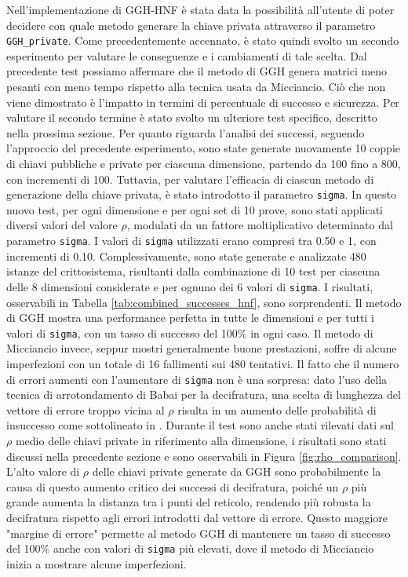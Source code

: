 Nell'implementazione di GGH-HNF è stata data la possibilità all'utente di poter decidere
con quale metodo generare la chiave privata attraverso il parametro \texttt{GGH\_private}.
Come precedentemente accennato, è stato quindi svolto un secondo esperimento per valutare 
le conseguenze e i cambiamenti di tale scelta. Dal precedente test possiamo affermare
che il metodo di GGH genera matrici meno pesanti con meno tempo rispetto alla tecnica
usata da Micciancio. Ciò che non viene dimostrato è l'impatto in termini di percentuale 
di successo e sicurezza. Per valutare il secondo termine è stato svolto un ulteriore 
test specifico, descritto nella prossima sezione. 
Per quanto riguarda l'analisi dei successi, seguendo l'approccio del precedente esperimento,
sono state generate nuovamente 10 
coppie di chiavi pubbliche e private per ciascuna dimensione, 
partendo da 100 fino a 800, con incrementi di 100.
Tuttavia, per valutare l'efficacia di ciascun metodo di generazione della chiave privata, 
è stato introdotto il parametro \texttt{sigma}.
In questo nuovo test, per ogni dimensione e per ogni set di 10 
prove, sono stati applicati diversi valori del valore $\rho$, modulati da un fattore 
moltiplicativo determinato dal parametro \texttt{sigma}. 
I valori di \texttt{sigma} utilizzati erano compresi tra 0.50 e 1, con incrementi di 0.10. 
Complessivamente, sono state generate e analizzate 480 istanze del crittosistema, 
risultanti dalla combinazione di 10 test per ciascuna delle 8 dimensioni considerate e 
per ognuno dei 6 valori di \texttt{sigma}.
I risultati, osservabili in Tabella \ref{tab:combined_successes_hnf}, sono sorprendenti. 
Il metodo di GGH mostra una performance perfetta in tutte le dimensioni e per tutti i valori 
di \texttt{sigma}, con un tasso di successo del 100\% in ogni caso. Il metodo di 
Micciancio invece, seppur mostri generalmente buone prestazioni, soffre di alcune 
imperfezioni con un totale di 16 fallimenti sui 480 tentativi. Il fatto che il numero di errori
aumenti con l'aumentare di \texttt{sigma} non è una sorpresa: dato l'uso della
tecnica di arrotondamento di Babai per la decifratura, una scelta di lunghezza del 
vettore di errore troppo vicina al $\rho$ risulta in un aumento delle probabilità di insuccesso 
come sottolineato in \cite[Sezione 3.1]{HNF04}. 
Durante il test sono anche stati rilevati dati sul $\rho$ medio delle chiavi private 
in riferimento alla dimensione, i risultati sono stati discussi nella precedente sezione e 
sono osservabili in Figura \ref{fig:rho_comparison}. 
L'alto valore di $\rho$ delle chiavi private generate da GGH sono probabilmente la causa 
di questo aumento critico dei successi di decifratura, poiché un $\rho$ più grande aumenta 
la distanza tra i punti del reticolo, rendendo più robusta la decifratura rispetto agli 
errori introdotti dal vettore di errore. Questo maggiore "margine di errore" permette 
al metodo GGH di mantenere un tasso di successo del 100\% anche con valori di \texttt{sigma} 
più elevati, dove il metodo di Micciancio inizia a mostrare alcune imperfezioni. 



